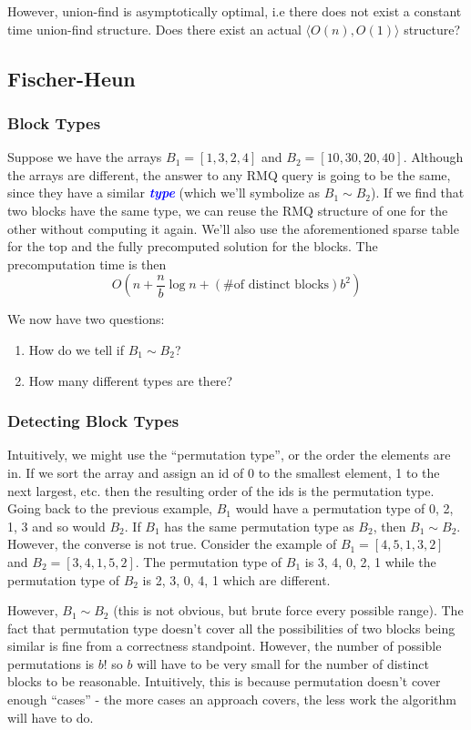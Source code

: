\documentclass[11pt, oneside]{article}
\newcommand{\emphasis}[1]{\textcolor{blue}{\textbf{\textit{#1}}}}
\begin{document}
However, union-find is asymptotically optimal, i.e there does not exist a constant time
union-find structure. Does there exist an actual \( \langle O(n), O(1) \rangle \) structure?

\subsection{Fischer-Heun}

\subsubsection{Block Types}
Suppose we have the arrays \( B_1 = [1, 3, 2, 4] \) and \( B_2 = [10, 30, 20, 40] \).
Although the arrays are different, the answer to any RMQ query is going to be the same,
since they have a similar \emphasis{type} (which we'll symbolize as \( B_1 \sim B_2 \)).
If we find that two blocks have the same type, we can reuse the RMQ structure of one
for the other without computing it again. We'll also use the aforementioned sparse table
for the top and the fully precomputed solution for the blocks.
The precomputation time is then
\[ O(n + \frac{n}{b} \log n + (\text{\# of distinct blocks}) b^2) \]

We now have two questions:
\begin{enumerate}
  \item How do we tell if \( B_1 \sim B_2 \)?
  \item How many different types are there?
\end{enumerate}

\subsubsection{Detecting Block Types}
Intuitively, we might use the ``permutation type'', or the order the elements are in.
If we sort the array and assign an id of 0 to the smallest element, 1 to the next largest, etc.
then the resulting order of the ids is the permutation type. Going back to the previous example,
\( B_1 \) would have a permutation type of 0, 2, 1, 3 and so would \( B_2 \).
If \( B_1 \) has the same permutation type as \( B_2 \), then \( B_1 \sim B_2 \).
However, the converse is not true. Consider the example of \( B_1 = [4, 5, 1, 3, 2] \) and \( B_2 = [3, 4, 1, 5, 2] \).
The permutation type of \( B_1 \) is 3, 4, 0, 2, 1 while the permutation type of \( B_2 \) is 2, 3, 0, 4, 1
which are different.

However, \( B_1 \sim B_2 \) (this is not obvious, but brute force every possible range).
The fact that permutation type doesn't cover all the possibilities of two blocks being similar is fine
from a correctness standpoint. However, the number of possible permutations is \( b! \)
so \( b \) will have to be very small for the number of distinct blocks to be reasonable.
Intuitively, this is because permutation doesn't cover enough ``cases'' - the more cases
an approach covers, the less work the algorithm will have to do.
\end{document}
